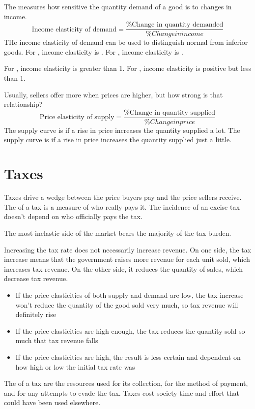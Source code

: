 \documentclass{article}
\begin{document}
The  measures how sensitive the quantity demand of a good is to changes in income. $$\textrm{Income elasticity of demand} = \frac{\textrm{\% Change in quantity demanded}}{{\% Change in income}}$$ THe income elasticity of demand can be used to distinguish normal from inferior goods. For , income elasticity is . For , income elasticity is . 

\begin{remark}
  For , income elasticity is greater than 1. For , income elasticity is positive but less than 1. 
\end{remark}

Usually, sellers offer more when prices are higher, but how strong is that relationship? $$\textrm{Price elasticity of supply} = \frac{\textrm{\% Change in quantity supplied}}{{\% Change in price}}$$ The supply curve is  if a rise in price increases the quantity supplied a lot. The supply curve is  if a rise in price increases the quantity supplied just a little. 

\section{Taxes}

Taxes drive a wedge between the price buyers pay and the price sellers receive. The  of a tax is a measure of who really pays it. The incidence of an excise tax doesn't depend on who officially pays the tax. 

\begin{remark}
  The most inelastic side of the market bears the majority of the tax burden.
\end{remark}

Increasing the tax rate does not necessarily increase revenue. On one side, the tax increase means that the government raises more revenue for each unit sold, which increases tax revenue. On the other side, it reduces the quantity of sales, which decrease tax revenue. 
\begin{itemize}
  \item If the price elasticities of both supply and demand are low, the tax increase won't reduce the quantity of the good sold very much, so tax revenue will definitely rise 
  \item If the price elasticities are high enough, the tax reduces the quantity sold so much that tax revenue falls 
  \item If the price elasticities are high, the result is less certain and dependent on how high or low the initial tax rate was
\end{itemize}
The  of a tax are the resources used for its collection, for the method of payment, and for any attempts to evade the tax. Taxes cost society time and effort that could have been used elsewhere. \\ 
\end{document}
